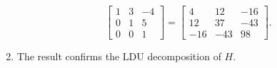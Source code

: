 \documentclass[8pt, a4paper, landscape]{extarticle}
\begin{document}
\begin{multicols*}{4}
\begin{enumerate}
\[\begin{bmatrix}
              1 & 3 & -4 \\
              0 & 1 & 5  \\
              0 & 0 & 1
            \end{bmatrix}
            = \begin{bmatrix}
              4   & 12  & -16 \\
              12  & 37  & -43 \\
              -16 & -43 & 98
            \end{bmatrix}.
          \]
    \item The result confirms the LDU decomposition of $H$.
  \end{enumerate}



\end{multicols*}

\pagebreak
\end{document}
